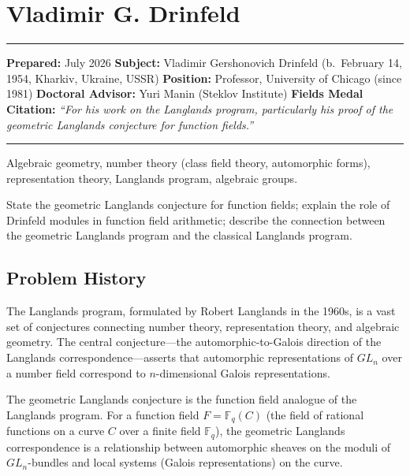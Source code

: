 \chapter{Vladimir G. Drinfeld}\label{ch1990vladimirdrinfeld:vladimir-g.-drinfeld-fields-medal-1990-a-comprehensive-report}

\begin{center}\rule{0.5\linewidth}{0.5pt}\end{center}

\textbf{Prepared:} July 2026 \textbf{Subject:} Vladimir Gershonovich Drinfeld (b.~February 14, 1954, Kharkiv, Ukraine, USSR) \textbf{Position:} Professor, University of Chicago (since 1981) \textbf{Doctoral Advisor:} Yuri Manin (Steklov Institute) \textbf{Fields Medal Citation:} \emph{``For his work on the Langlands program, particularly his proof of the geometric Langlands conjecture for function fields.''}

\begin{center}\rule{0.5\linewidth}{0.5pt}\end{center}

\begin{prereqs} Algebraic geometry, number theory (class field theory, automorphic forms), representation theory, Langlands program, algebraic groups. \end{prereqs}

\begin{objectives} State the geometric Langlands conjecture for function fields; explain the role of Drinfeld modules in function field arithmetic; describe the connection between the geometric Langlands program and the classical Langlands program. \end{objectives}

\section{Problem History}

The Langlands program, formulated by Robert Langlands in the 1960s, is a vast set of conjectures connecting number theory, representation theory, and algebraic geometry. The central conjecture---the automorphic-to-Galois direction of the Langlands correspondence---asserts that automorphic representations of $GL_n$ over a number field correspond to $n$-dimensional Galois representations.

The geometric Langlands conjecture is the function field analogue of the Langlands program. For a function field $F = \mathbb{F}_q(C)$ (the field of rational functions on a curve $C$ over a finite field $\mathbb{F}_q$), the geometric Langlands correspondence is a relationship between automorphic sheaves on the moduli of $GL_n$-bundles and local systems (Galois representations) on the curve.

